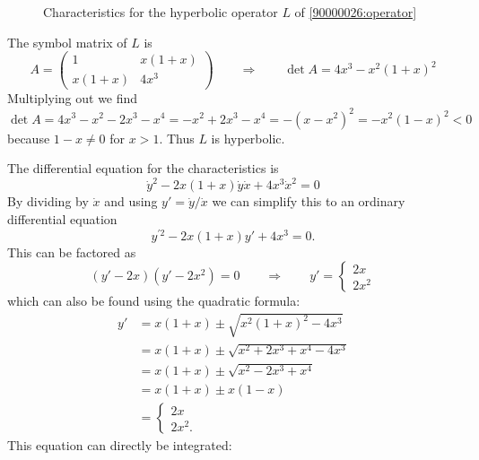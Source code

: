 \begin{loesung}
\begin{figure}
\caption{Characteristics for the hyperbolic operator $L$ of
\eqref{90000026:operator}
\label{90000026:fig}}
\end{figure}
\begin{teilaufgaben}
\item
The symbol matrix of $L$ is
\[
A
=
\begin{pmatrix}
  1    & x(1+x) \\
x(1+x) & 4x^3
\end{pmatrix}
\qquad\Rightarrow\qquad
\det A = 4x^3 -x^2(1+x)^2
\]
Multiplying out we find
\[
\det A
=
4x^3 - x^2 -2x^3 -x^4
=
-x^2 + 2x^3 -x^4
=
-(x-x^2)^2
=
-x^2 (1-x)^2
<
0
\]
because $1-x\ne 0$ for $x>1$.
Thus  $L$ is hyperbolic.
\item
The differential equation for the characteristics is
\[
\dot{y}^2 -2x(1+x) \dot{y}\dot{x} + 4x^3\dot{x}^2 = 0
\]
By dividing by $\dot{x}$ and using $y'=\dot{y}/\dot{x}$ we can simplify
this to an ordinary differential equation
\[
y^{\prime 2} -2x(1+x)y' + 4x^3 = 0.
\]
This can be factored as
\[
(y'-2x)(y'-2x^2) = 0
\qquad\Rightarrow\qquad
y'
=
\begin{cases}
2x\\
2x^2
\end{cases}
\]
which can also be found using the quadratic formula:
\begin{align*}
y'
&=
x(1+x) \pm \sqrt{x^2(1+x)^2 - 4x^3}
\\
&=
x(1+x) \pm \sqrt{x^2+2x^3+x^4-4x^3}
\\
&=
x(1+x) \pm \sqrt{x^2-2x^3+x^4}
\\
&=
x(1+x) \pm x(1-x)
\\
&=
\begin{cases}
2x  \\
2x^2.
\end{cases}
\end{align*}
This equation can directly be integrated:
\begin{align*}

\end{align*}
\end{teilaufgaben}
\end{loesung}

